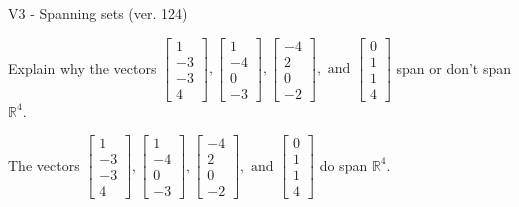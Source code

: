 \begin{exercise}
  \begin{exerciseTitle}V3 - Spanning sets (ver. 124)\end{exerciseTitle}
  \begin{exerciseStatement}
    Explain why the vectors \(\left[\begin{array}{r}
1 \\
-3 \\
-3 \\
4
\end{array}\right] , \left[\begin{array}{r}
1 \\
-4 \\
0 \\
-3
\end{array}\right] , \left[\begin{array}{r}
-4 \\
2 \\
0 \\
-2
\end{array}\right] , \text{ and } \left[\begin{array}{r}
0 \\
1 \\
1 \\
4
\end{array}\right]\) span or don't span \(\mathbb{R}^4\). 
	


  \end{exerciseStatement}
  \begin{exerciseAnswer}
   The vectors \(\left[\begin{array}{r}
1 \\
-3 \\
-3 \\
4
\end{array}\right] , \left[\begin{array}{r}
1 \\
-4 \\
0 \\
-3
\end{array}\right] , \left[\begin{array}{r}
-4 \\
2 \\
0 \\
-2
\end{array}\right] , \text{ and } \left[\begin{array}{r}
0 \\
1 \\
1 \\
4
\end{array}\right]\) 
  	 do  
	span \(\mathbb{R}^4\).
  


  \end{exerciseAnswer}
\end{exercise}